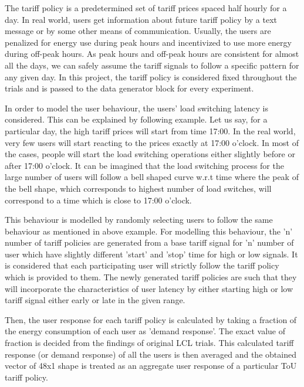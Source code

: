 The tariff policy is a predetermined set of tariff prices spaced half hourly for a day. In real world, users get information about future tariff policy by a text message or by some other means of communication. Usually, the users are penalized for energy use during peak hours and incentivized to use more energy during off-peak hours. As peak hours and off-peak hours are consistent for almost all the days, we can safely assume the tariff signals to follow a specific pattern for any given day. In this project, the tariff policy is considered fixed throughout the trials and is passed to the data generator block for every experiment.

In order to model the user behaviour, the users' load switching latency is considered. This can be explained by following example. Let us say, for a particular day, the high tariff prices will start from time 17:00. In the real world, very few users will start reacting to the prices exactly at 17:00 o'clock. In most of the cases, people will start the load switching operations either slightly before or after 17:00 o'clock. It can be imagined that the load switching process for the large number of users will follow a bell shaped curve w.r.t time where the peak of the bell shape, which corresponds to highest number of load switches, will correspond to a time which is close to 17:00 o'clock. 

This behaviour is modelled by randomly selecting users to follow the same behaviour as mentioned in above example. For modelling this behaviour, the 'n' number of tariff policies are generated from a base tariff signal for 'n' number of user which have slightly different 'start' and 'stop' time for high or low signals. It is considered that each participating user will strictly follow the tariff policy which is provided to them. The newly generated tariff policies are such that they will incorporate the characteristics of user latency by either starting high or low tariff signal either early or late in the given range.

Then, the user response for each tariff policy is calculated by taking a fraction of the energy consumption of each user as 'demand response'. The exact value of fraction is decided from the findings of original LCL trials. This calculated tariff response (or demand response) of all the users is then averaged and the obtained vector of 48x1 shape is treated as an aggregate user response of a particular ToU tariff policy.

